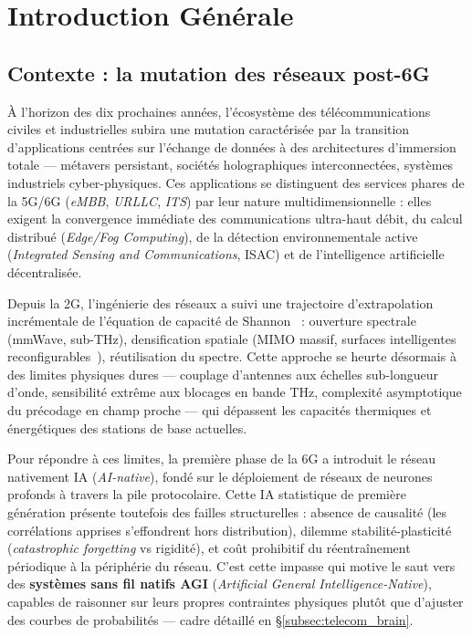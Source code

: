 \documentclass[12pt,a4paper,titlepage]{article}
\begin{document}
\newpage
\tableofcontents
\newpage

\section{Introduction Générale}

\subsection{Contexte : la mutation des réseaux post-6G}

À l'horizon des dix prochaines années, l'écosystème des télécommunications civiles et industrielles subira une mutation caractérisée par la transition d'applications centrées sur l'échange de données à des architectures d'immersion totale --- métavers persistant, sociétés holographiques interconnectées, systèmes industriels cyber-physiques. Ces applications se distinguent des services phares de la 5G/6G (\textit{eMBB}, \textit{URLLC}, \textit{ITS}) par leur nature multidimensionnelle : elles exigent la convergence immédiate des communications ultra-haut débit, du calcul distribué (\textit{Edge/Fog Computing}), de la détection environnementale active (\textit{Integrated Sensing and Communications}, ISAC) et de l'intelligence artificielle décentralisée.

Depuis la 2G, l'ingénierie des réseaux a suivi une trajectoire d'extrapolation incrémentale de l'équation de capacité de Shannon~\cite{shannon1948} : ouverture spectrale (mmWave, sub-THz), densification spatiale (MIMO massif, surfaces intelligentes reconfigurables~\cite{cell_free_mimo}), réutilisation du spectre. Cette approche se heurte désormais à des limites physiques dures --- couplage d'antennes aux échelles sub-longueur d'onde, sensibilité extrême aux blocages en bande THz, complexité asymptotique du précodage en champ proche --- qui dépassent les capacités thermiques et énergétiques des stations de base actuelles.

Pour répondre à ces limites, la première phase de la 6G a introduit le réseau nativement IA (\textit{AI-native}), fondé sur le déploiement de réseaux de neurones profonds à travers la pile protocolaire. Cette IA statistique de première génération présente toutefois des failles structurelles : absence de causalité (les corrélations apprises s'effondrent hors distribution), dilemme stabilité-plasticité (\textit{catastrophic forgetting} vs rigidité), et coût prohibitif du réentraînement périodique à la périphérie du réseau. C'est cette impasse qui motive le saut vers des \textbf{systèmes sans fil natifs AGI} (\textit{Artificial General Intelligence-Native}), capables de raisonner sur leurs propres contraintes physiques plutôt que d'ajuster des courbes de probabilités --- cadre détaillé en \S\ref{subsec:telecom_brain}.
\end{document}
